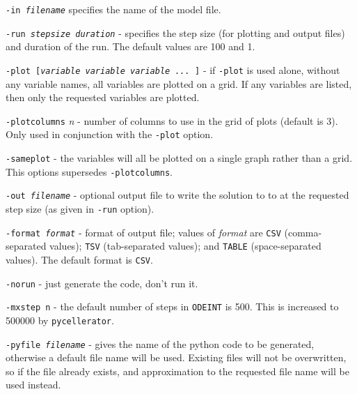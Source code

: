 
{\tt -in \textit{filename}} specifies the name of the model file.

{\tt -run  \textit{stepsize duration}} - specifies the step size (for plotting and output files) and duration of the run. The default values are 100 and 1. 

{\tt -plot [\textit{variable variable variable ...} \tt ]}  - if {\tt -plot} is used alone, without any variable names, all variables are plotted on a grid. If any variables are listed, then only the requested variables are plotted. 

{\tt -plotcolumns} \textit{n}  - number of columns to use in the grid of plots (default is 3). Only used in conjunction with the {\tt -plot} option. 

{\tt -sameplot} - the variables will all be plotted on a single graph rather than a grid. This options supersedes {\tt -plotcolumns}. 

{\tt -out \textit{filename}}  - optional output file to write the solution to to at the requested step size (as given in {\tt -run} option). 

{\tt -format \textit{format}} - format of output file; values of \textit{format} are {\tt CSV} (comma-separated values); {\tt TSV} (tab-separated values); and {\tt TABLE} (space-separated values). The default format is {\tt CSV}. 

{\tt -norun} - just generate the code, don't run it. 

{\tt -mxstep n} - the default number of steps in {\tt ODEINT} is 500. This is increased to 500000 by {\tt pycellerator}. 

{\tt -pyfile \textit{filename}} - gives the name of the python code to be generated, otherwise a default file name will be used. Existing files will not be overwritten, so if the file already exists, and approximation to the requested file name will be used instead. 


